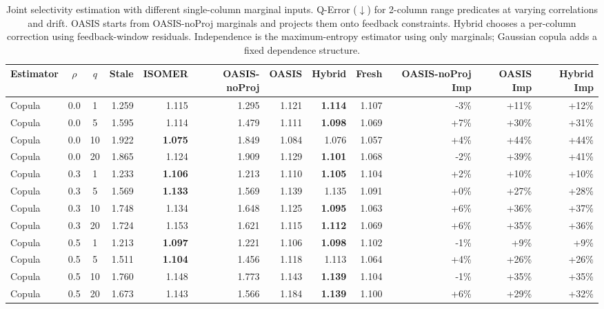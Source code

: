 \begin{table}[t]
  \centering
  \small
  \caption{Joint selectivity estimation with different single-column marginal inputs. Q-Error ($\downarrow$) for 2-column range predicates at varying correlations and drift. OASIS starts from OASIS-noProj marginals and projects them onto feedback constraints. Hybrid chooses a per-column correction using feedback-window residuals. Independence is the maximum-entropy estimator using only marginals; Gaussian copula adds a fixed dependence structure.}
  \label{tab:copula}
  \setlength{\tabcolsep}{3pt}
  \begin{tabular}{lcc | rrrrrr | rrr}
    \toprule
    Estimator & $\rho$ & $q$ & Stale & ISOMER & OASIS-noProj & OASIS & Hybrid & Fresh & OASIS-noProj Imp & OASIS Imp & Hybrid Imp \\
    \midrule
    Copula & 0.0 & 1 & 1.259 & 1.115 & 1.295 & 1.121 & \textbf{1.114} & 1.107 & -3\% & +11\% & +12\% \\
    Copula & 0.0 & 5 & 1.595 & 1.114 & 1.479 & 1.111 & \textbf{1.098} & 1.069 & +7\% & +30\% & +31\% \\
    Copula & 0.0 & 10 & 1.922 & \textbf{1.075} & 1.849 & 1.084 & 1.076 & 1.057 & +4\% & +44\% & +44\% \\
    Copula & 0.0 & 20 & 1.865 & 1.124 & 1.909 & 1.129 & \textbf{1.101} & 1.068 & -2\% & +39\% & +41\% \\
    Copula & 0.3 & 1 & 1.233 & \textbf{1.106} & 1.213 & 1.110 & \textbf{1.105} & 1.104 & +2\% & +10\% & +10\% \\
    Copula & 0.3 & 5 & 1.569 & \textbf{1.133} & 1.569 & 1.139 & 1.135 & 1.091 & +0\% & +27\% & +28\% \\
    Copula & 0.3 & 10 & 1.748 & 1.134 & 1.648 & 1.125 & \textbf{1.095} & 1.063 & +6\% & +36\% & +37\% \\
    Copula & 0.3 & 20 & 1.724 & 1.153 & 1.621 & 1.115 & \textbf{1.112} & 1.069 & +6\% & +35\% & +36\% \\
    Copula & 0.5 & 1 & 1.213 & \textbf{1.097} & 1.221 & 1.106 & \textbf{1.098} & 1.102 & -1\% & +9\% & +9\% \\
    Copula & 0.5 & 5 & 1.511 & \textbf{1.104} & 1.456 & 1.118 & 1.113 & 1.064 & +4\% & +26\% & +26\% \\
    Copula & 0.5 & 10 & 1.760 & 1.148 & 1.773 & 1.143 & \textbf{1.139} & 1.104 & -1\% & +35\% & +35\% \\
    Copula & 0.5 & 20 & 1.673 & 1.143 & 1.566 & 1.184 & \textbf{1.139} & 1.100 & +6\% & +29\% & +32\% \\

\end{tabular}
\end{table}
